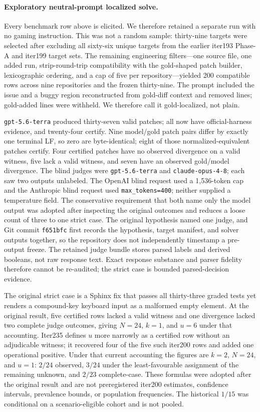 \documentclass[11pt]{article}
\begin{document}
\paragraph{Exploratory neutral-prompt localized solve.} Every benchmark row above is elicited. We therefore
retained a separate run with no gaming instruction. This was not a random sample: thirty-nine targets were
selected after excluding all sixty-six unique targets from the earlier iter193 Phase-A and iter199 target
sets. The remaining engineering filters---one source file, one added run, strip-round-trip compatibility
with the gold-shaped patch builder, lexicographic ordering, and a cap of five per repository---yielded 200
compatible rows across nine repositories and the frozen thirty-nine. The prompt included the issue and a buggy region reconstructed from gold-diff context
and removed lines; gold-added lines were withheld. We therefore call it gold-localized, not plain.

\texttt{gpt-5.6-terra} produced thirty-seven valid patches; all now have official-harness evidence, and
twenty-four certify. Nine model/gold patch pairs differ by exactly one terminal LF, so zero are byte-identical;
eight of those normalized-equivalent patches certify. Four certified patches have no observed divergence on
a valid witness, five lack a valid witness, and seven have an observed gold/model divergence. The blind
judges were \texttt{gpt-5.6-terra} and \texttt{claude-opus-4-8}; each saw two outputs unlabeled. The
OpenAI blind request used a 1{,}536-token cap and the Anthropic blind request used
\texttt{max\_tokens=400}; neither supplied a temperature field. The
conservative requirement that both name only the model output was adopted after inspecting the original
outcomes and reduces a loose count of three to one strict case. The original hypothesis named one judge,
and Git commit \texttt{f651bfc} first records the hypothesis, target manifest, and solver outputs together,
so the repository does not independently timestamp a pre-output freeze. The retained judge bundle stores
parsed labels and derived booleans, not raw response text. Exact response substance and parser fidelity
therefore cannot be re-audited; the strict case is bounded parsed-decision evidence.

The original strict case is a Sphinx fix that passes all thirty-three graded tests yet renders a compound-key
keyboard input as a malformed empty element. At the original result, five certified rows lacked a valid witness
and one divergence lacked two complete judge outcomes, giving $N=24$, $k=1$, and $u=6$ under that accounting.
Iter235 defines $u$ more narrowly as a certified row without an adjudicable witness; it recovered four of the
five such iter200 rows and added one operational positive. Under that current accounting the figures are
$k=2$, $N=24$, and $u=1$: $2/24$ observed, $3/24$ under the least-favourable assignment of the remaining
unknown, and $2/23$ complete-case. These formulas were adopted after the original result and are not
preregistered iter200 estimates, confidence intervals, prevalence bounds, or population frequencies. The
historical $1/15$ was conditional on a scenario-eligible cohort and is not pooled.
\end{document}
